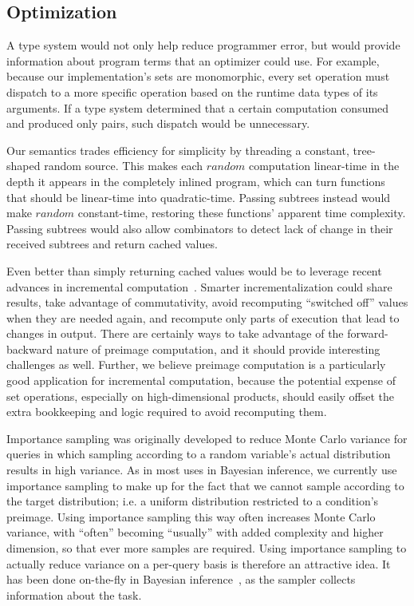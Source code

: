 \subsection{Optimization}

A type system would not only help reduce programmer error, but would provide information about program terms that an optimizer could use.
For example, because our implementation's sets are monomorphic, every set operation must dispatch to a more specific operation based on the runtime data types of its arguments.
If a type system determined that a certain computation consumed and produced only pairs, such dispatch would be unnecessary.

Our semantics trades efficiency for simplicity by threading a constant, tree-shaped random source.
This makes each $random$ computation linear-time in the depth it appears in the completely inlined program, which can turn functions that should be linear-time into quadratic-time.
Passing subtrees instead would make $random$ constant-time, restoring these functions' apparent time complexity.
Passing subtrees would also allow combinators to detect lack of change in their received subtrees and return cached values.

Even better than simply returning cached values would be to leverage recent advances in incremental computation~\cite{cit:hammer-2014-adapton}.
Smarter incrementalization could share results, take advantage of commutativity, avoid recomputing ``switched off'' values when they are needed again, and recompute only parts of execution that lead to changes in output.
There are certainly ways to take advantage of the forward-backward nature of preimage computation, and it should provide interesting challenges as well.
Further, we believe preimage computation is a particularly good application for incremental computation, because the potential expense of set operations, especially on high-dimensional products, should easily offset the extra bookkeeping and logic required to avoid recomputing them.

Importance sampling was originally developed to reduce Monte Carlo variance for queries in which sampling according to a random variable's actual distribution results in high variance.
As in most uses in Bayesian inference, we currently use importance sampling to make up for the fact that we cannot sample according to the target distribution; i.e. a uniform distribution restricted to a condition's preimage.
Using importance sampling this way often increases Monte Carlo variance, with ``often'' becoming ``usually'' with added complexity and higher dimension, so that ever more samples are required.
Using importance sampling to actually reduce variance on a per-query basis is therefore an attractive idea.
It has been done on-the-fly in Bayesian inference~\cite{cit:cheng-2000-adaptive-importance}, as the sampler collects information about the task.

